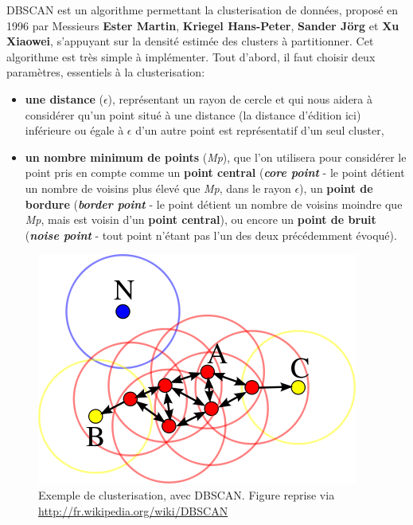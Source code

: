 \documentclass[pdftex,12pt,a4paper]{report}
\begin{document}
\begin{spacing}{1.2}
DBSCAN est un algorithme permettant la clusterisation de données, proposé en 1996 par Messieurs \textbf{Ester Martin}, \textbf{Kriegel Hans-Peter}, \textbf{Sander Jörg} et \textbf{Xu Xiaowei}, s'appuyant sur la densité estimée des clusters à partitionner.
Cet algorithme est très simple à implémenter.
\newline
Tout d'abord, il faut choisir deux paramètres, essentiels à la clusterisation:
\begin{itemize}
\item{\textbf{une distance} ($\epsilon$), représentant un rayon de cercle et qui nous aidera à considérer qu'un point situé à une distance (la distance d'édition ici) inférieure ou égale à $\epsilon$ d'un autre point est représentatif d'un seul cluster},
\item{\textbf{un nombre minimum de points} (\textit{Mp}), que l'on utilisera pour considérer le point pris en compte comme un \textbf{point central} (\textit{\textbf{core point}} - le point détient un nombre de voisins plus élevé que \textit{Mp}, dans le rayon $\epsilon$), un \textbf{point de bordure} (\textit{\textbf{border point}} - le point détient un nombre de voisins moindre que \textit{Mp}, mais est voisin d'un \textbf{point central}), ou encore un \textbf{point de bruit} (\textit{\textbf{noise point}} - tout point n'étant pas l'un des deux précédemment évoqué).}
\end{itemize}

\begin{figure}[H]
\begin{center}
	\includegraphics[scale=0.45]{img/400px-DBSCAN-Illustration.png}
\end{center}
\caption{Exemple de clusterisation, avec DBSCAN. Figure reprise via \url{http://fr.wikipedia.org/wiki/DBSCAN}}
\end{figure}


\end{spacing}
\end{document}
